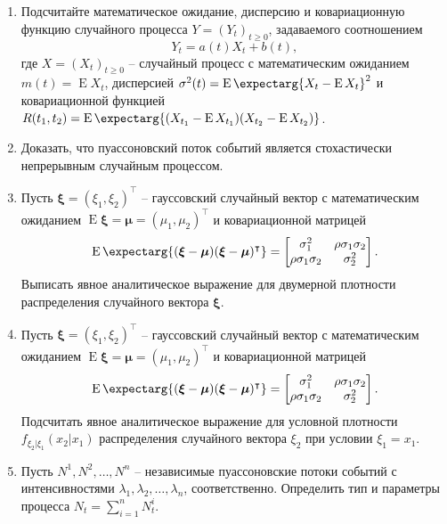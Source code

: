 \documentclass[a4paper,12pt]{extreport}
\renewcommand{\=}[1]{\stackrel{#1}{=}} %
\newcommand{\Expect}{\mathop{{}\mathrm{E}}}
\newcommand{\Expectmore}{\operatorname{E}\expectarg}
\newcommand{\generaltime}{t \geqslant 0}
\newcommand{\newprocess}[1]{
	\ensuremath{
		#1 = \left(#1 _t\right)_{\generaltime}
	}
}
\begin{document}
\newpage

\section*{}

\begin{enumerate}
	\item Подсчитайте математическое ожидание, дисперсию
	и ковариационную функцию случайного процесса
	$\newprocess{Y}$, задаваемого соотношением
	\[
	Y_t = a(t) X_t + b(t),
	\]
	где $\newprocess{X}$ -- случайный процесс с математическим ожиданием 
	$m(t) = \Expect X_t$, дисперсией $\sigma^2(t) = \Expectmore{X_t - \Expect X_t}^2$
	и ковариационной функцией $R(t_1, t_2) = 
	\Expectmore{(X_{t_1} - \Expect X_{t_1})(X_{t_2} - \Expect X_{t_2})}$.

	\item Доказать, что пуассоновский поток событий является стохастически 
	непрерывным случайным процессом.

	\item Пусть $\bm{\xi} = (\xi_1, \xi_2)^{\intercal}$ -- гауссовский случайный вектор
	с математическим ожиданием $\Expect \bm{\xi} = \bm{\mu} = (\mu_1, \mu_2)^{\intercal}$
	и ковариационной матрицей 
	\[
	\Expectmore{(\bm{\xi} - \bm{\mu})(\bm{\xi} - \bm{\mu})^{\intercal}} = 
	  \begin{bmatrix}
	    \sigma_1^2 & \rho \sigma_1 \sigma_2\\
	    \rho \sigma_1 \sigma_2 & \sigma_2^2
	  \end{bmatrix}.
	\]
	Выписать явное аналитическое выражение для двумерной плотности
	распределения случайного вектора $\bm{\xi}$.

	\item Пусть $\bm{\xi} = (\xi_1, \xi_2)^{\intercal}$ -- гауссовский случайный вектор
	с математическим ожиданием $\Expect \bm{\xi} = \bm{\mu} = (\mu_1, \mu_2)^{\intercal}$
	и ковариационной матрицей 
	\[
	\Expectmore{(\bm{\xi} - \bm{\mu})(\bm{\xi} - \bm{\mu})^{\intercal}} = 
	  \begin{bmatrix}
	    \sigma_1^2 & \rho \sigma_1 \sigma_2\\
	    \rho \sigma_1 \sigma_2 & \sigma_2^2
	  \end{bmatrix}.
	\]
	Подсчитать явное аналитическое выражение для условной плотности
	$f_{\xi_2|\xi_1}(x_2 | x_1)$
	распределения случайного вектора $\xi_2$ при условии $\xi_1 = x_1$.

	\item Пусть $N^1, N^2, \ldots, N^n$ -- независимые пуассоновские потоки событий
	с интенсивностями $\lambda_1, \lambda_2, \ldots, \lambda_n$, соответственно.
	Определить тип и параметры процесса $N_t = \sum\limits_{i=1}^n N^i_t$.



\end{enumerate}
\end{document}
